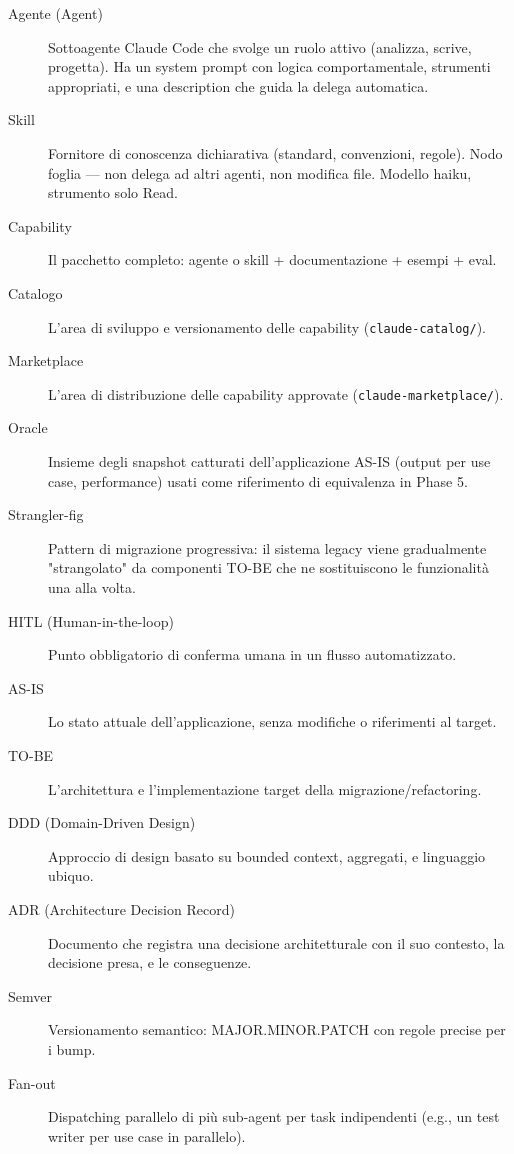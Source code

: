 \documentclass[12pt,a4paper,twoside]{book}
\begin{document}
\begin{description}
  \item[Agente (Agent)] Sottoagente Claude Code che svolge un ruolo attivo (analizza, scrive, progetta). Ha un system prompt con logica comportamentale, strumenti appropriati, e una description che guida la delega automatica.
  \item[Skill] Fornitore di conoscenza dichiarativa (standard, convenzioni, regole). Nodo foglia — non delega ad altri agenti, non modifica file. Modello haiku, strumento solo Read.
  \item[Capability] Il pacchetto completo: agente o skill + documentazione + esempi + eval.
  \item[Catalogo] L'area di sviluppo e versionamento delle capability (\texttt{claude-catalog/}).
  \item[Marketplace] L'area di distribuzione delle capability approvate (\texttt{claude-marketplace/}).
  \item[Oracle] Insieme degli snapshot catturati dell'applicazione AS-IS (output per use case, performance) usati come riferimento di equivalenza in Phase 5.
  \item[Strangler-fig] Pattern di migrazione progressiva: il sistema legacy viene gradualmente "strangolato" da componenti TO-BE che ne sostituiscono le funzionalità una alla volta.
  \item[HITL (Human-in-the-loop)] Punto obbligatorio di conferma umana in un flusso automatizzato.
  \item[AS-IS] Lo stato attuale dell'applicazione, senza modifiche o riferimenti al target.
  \item[TO-BE] L'architettura e l'implementazione target della migrazione/refactoring.
  \item[DDD (Domain-Driven Design)] Approccio di design basato su bounded context, aggregati, e linguaggio ubiquo.
  \item[ADR (Architecture Decision Record)] Documento che registra una decisione architetturale con il suo contesto, la decisione presa, e le conseguenze.
  \item[Semver] Versionamento semantico: MAJOR.MINOR.PATCH con regole precise per i bump.
  \item[Fan-out] Dispatching parallelo di più sub-agent per task indipendenti (e.g., un test writer per use case in parallelo).
\end{description}

\end{document}
